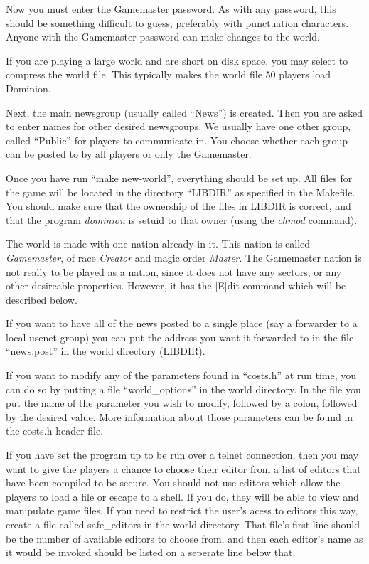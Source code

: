 Now you must enter the Gamemaster password.  As with any password, this
should be something difficult to guess, preferably with punctuation
characters.  Anyone with the Gamemaster password can make changes to
the world.

If you are playing a large world and are short on disk space, you may
select to compress the world file.  This typically makes the world file
50%
players load Dominion.

Next, the main newsgroup (usually called ``News'') is created.  Then
you are asked to enter names for other desired newsgroups.  We usually
have one other group, called ``Public'' for players to communicate in.
You choose whether each group can be posted to by all players or only
the Gamemaster.

Once you have run ``make new-world'', everything should be set up.
All files for the game will be located in the directory ``LIBDIR'' as
specified in the Makefile.  You should make sure that the ownership of
the files in LIBDIR is correct, and that the program {\em dominion} is
setuid to that owner (using the {\em chmod} command).

The world is made with one nation already in it.  This nation is
called {\em Gamemaster}, of race {\em Creator} and magic order {\em
Master}.  The Gamemaster nation is not really to be played as a
nation, since it does not have any sectors, or any other desireable
properties.  However, it has the [E]dit command which will be
described below.

If you want to have all of the news posted to a single place (say a
forwarder to a local usenet group) you can put the address you want it
forwarded to in the file ``news.post'' in the world directory
(LIBDIR).

If you want to modify any of the parameters found in ``costs.h'' at
run time, you can do so by putting a file ``world\_options'' in
the world directory.  In the file you put the name of the parameter
you wish to modify, followed by a colon, followed by the desired
value.  More information about those parameters can be found in 
the costs.h header file.

If you have set the program up to be run over a telnet connection,
then you may want to give the players a chance to choose their editor
from a list of editors that have been compiled to be secure.  You
should not use editors which allow the players to load a file or
escape to a shell.  If you do, they will be able to view and
manipulate game files.  If you need to restrict the user's acess to
editors this way, create a file called safe\_editors in the world
directory.  That file's first line should be the number of available
editors to choose from, and then each editor's name as it would be
invoked should be listed on a seperate line below that.

